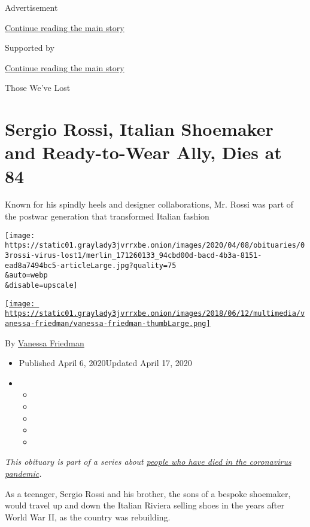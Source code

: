 Advertisement

\protect\hyperlink{after-top}{Continue reading the main story}

Supported by

\protect\hyperlink{after-sponsor}{Continue reading the main story}

Those We've Lost

\hypertarget{sergio-rossi-italian-shoemaker-and-ready-to-wear-ally-dies-at-84}{%
\section{Sergio Rossi, Italian Shoemaker and Ready-to-Wear Ally, Dies at
84}\label{sergio-rossi-italian-shoemaker-and-ready-to-wear-ally-dies-at-84}}

Known for his spindly heels and designer collaborations, Mr. Rossi was
part of the postwar generation that transformed Italian fashion

\texttt{[image: https://static01.graylady3jvrrxbe.onion/images/2020/04/08/obituaries/03rossi-virus-lost1/merlin\_171260133\_94cbd00d-bacd-4b3a-8151-ead8a7494bc5-articleLarge.jpg?quality=75\\\&auto=webp\\\&disable=upscale]}

\href{https://www.nytimes3xbfgragh.onion/by/vanessa-friedman}{\texttt{[image: https://static01.graylady3jvrrxbe.onion/images/2018/06/12/multimedia/vanessa-friedman/vanessa-friedman-thumbLarge.png]}}

By \href{https://www.nytimes3xbfgragh.onion/by/vanessa-friedman}{Vanessa
Friedman}

\begin{itemize}
\item
  Published April 6, 2020Updated April 17, 2020
\item
  \begin{itemize}
  \item
  \item
  \item
  \item
  \item
  \end{itemize}
\end{itemize}

\emph{This obituary is part of a series about}
\href{https://www.nytimes3xbfgragh.onion/series/people-who-have-died-of-the-coronavirus}{\emph{people
who have died in the coronavirus pandemic}}\emph{.}

As a teenager, Sergio Rossi and his brother, the sons of a bespoke
shoemaker, would travel up and down the Italian Riviera selling shoes in
the years after World War II, as the country was rebuilding.

